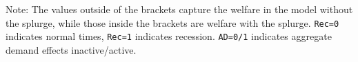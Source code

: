 \documentclass[\latexroot/\projectname]{subfiles}
\begin{document}
\begin{table}[tb] 
  \caption{\pregenmark Welfare for policies both out of and in a recession, with/without AD effects}
  \whenintegrated{\label{tab:welfare6-SplurgeComp}} %
  \centering


  \noindent\parbox{\textwidth}{
    \medskip
    \footnotesize Note: The values outside of the brackets capture the welfare in the model without the splurge, while those inside the brackets are welfare with the splurge. \texttt{Rec=0} indicates normal times, \texttt{Rec=1} indicates recession. \texttt{AD=0/1} indicates aggregate demand effects inactive/active.
  }
\end{table}

\vspace{0.5em}
\end{document}
